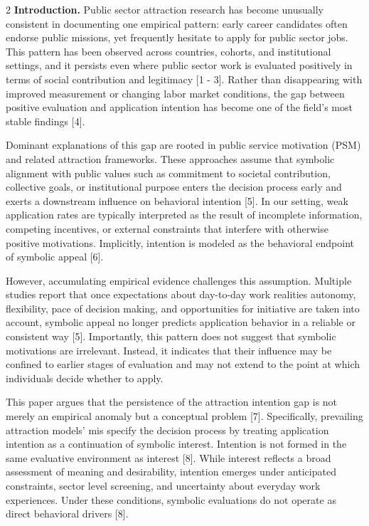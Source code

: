 \begin{multicols}{2}
{\bfseries Introduction.} Public sector attraction research has become
unusually consistent in documenting one empirical pattern: early career
candidates often endorse public missions, yet frequently hesitate to
apply for public sector jobs. This pattern has been observed across
countries, cohorts, and institutional settings, and it persists even
where public sector work is evaluated positively in terms of social
contribution and legitimacy {[}1 - 3{]}. Rather than disappearing with
improved measurement or changing labor market conditions, the gap
between positive evaluation and application intention has become one of
the field's most stable findings {[}4{]}.

Dominant explanations of this gap are rooted in public service
motivation (PSM) and related attraction frameworks. These approaches
assume that symbolic alignment with public values such as commitment to
societal contribution, collective goals, or institutional purpose enters
the decision process early and exerts a downstream influence on
behavioral intention {[}5{]}. In our setting, weak application rates are
typically interpreted as the result of incomplete information, competing
incentives, or external constraints that interfere with otherwise
positive motivations. Implicitly, intention is modeled as the behavioral
endpoint of symbolic appeal {[}6{]}.

However, accumulating empirical evidence challenges this assumption.
Multiple studies report that once expectations about day-to-day work
realities autonomy, flexibility, pace of decision making, and
opportunities for initiative are taken into account, symbolic appeal no
longer predicts application behavior in a reliable or consistent way
{[}5{]}. Importantly, this pattern does not suggest that symbolic
motivations are irrelevant. Instead, it indicates that their influence
may be confined to earlier stages of evaluation and may not extend to
the point at which individuals decide whether to apply.

This paper argues that the persistence of the attraction intention gap
is not merely an empirical anomaly but a conceptual problem {[}7{]}.
Specifically, prevailing attraction models' mis specify the decision
process by treating application intention as a continuation of symbolic
interest. Intention is not formed in the same evaluative environment as
interest {[}8{]}. While interest reflects a broad assessment of meaning
and desirability, intention emerges under anticipated constraints,
sector level screening, and uncertainty about everyday work experiences.
Under these conditions, symbolic evaluations do not operate as direct
behavioral drivers {[}8{]}.


\end{multicols}
